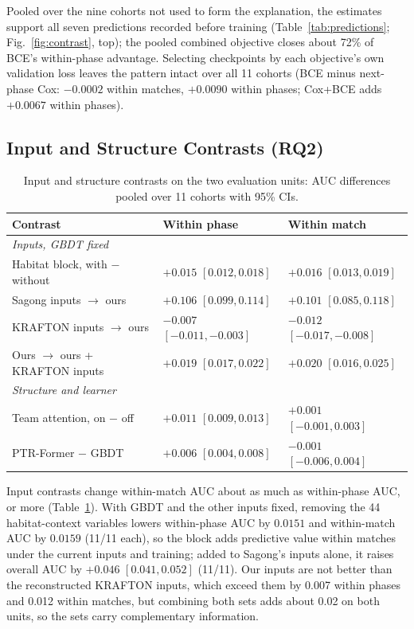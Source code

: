\documentclass[sigconf,anonymous]{acmart}
\begin{document}

Pooled over the nine cohorts not used to form the explanation, the estimates support all seven predictions recorded before training (Table~\ref{tab:predictions}; Fig.~\ref{fig:contrast}, top); the pooled combined objective closes about 72\% of BCE's within-phase advantage. Selecting checkpoints by each objective's own validation loss leaves the pattern intact over all 11 cohorts (BCE minus next-phase Cox: $-0.0002$ within matches, $+0.0090$ within phases; Cox+BCE adds $+0.0067$ within phases).

\subsection{Input and Structure Contrasts (RQ2)}
\label{sec:results:inputs}
\begin{table}[t]
\centering\scriptsize
\caption{Input and structure contrasts on the two evaluation units: AUC differences pooled over 11 cohorts with 95\% CIs.}
\label{tab:contrasts}
\setlength{\tabcolsep}{2.5pt}
\begin{tabular}{lll}
\toprule
Contrast & Within phase & Within match \\
\midrule
\multicolumn{3}{l}{\emph{Inputs, GBDT fixed}} \\
Habitat block, with $-$ without & $+0.015$ $[0.012, 0.018]$ & $+0.016$ $[0.013, 0.019]$ \\
Sagong inputs $\to$ ours & $+0.106$ $[0.099, 0.114]$ & $+0.101$ $[0.085, 0.118]$ \\
KRAFTON inputs $\to$ ours & $-0.007$ $[-0.011, -0.003]$ & $-0.012$ $[-0.017, -0.008]$ \\
Ours $\to$ ours + KRAFTON inputs & $+0.019$ $[0.017, 0.022]$ & $+0.020$ $[0.016, 0.025]$ \\
\midrule
\multicolumn{3}{l}{\emph{Structure and learner}} \\
Team attention, on $-$ off & $+0.011$ $[0.009, 0.013]$ & $+0.001$ $[-0.001, 0.003]$ \\
PTR-Former $-$ GBDT & $+0.006$ $[0.004, 0.008]$ & $-0.001$ $[-0.006, 0.004]$ \\
\bottomrule
\end{tabular}
\end{table}
Input contrasts change within-match AUC about as much as within-phase AUC, or more (Table~\ref{tab:contrasts}). With GBDT and the other inputs fixed, removing the 44 habitat-context variables lowers within-phase AUC by $0.0151$ and within-match AUC by $0.0159$ (11/11 each), so the block adds predictive value within matches under the current inputs and training; added to Sagong's inputs alone, it raises overall AUC by $+0.046$ $[0.041,\allowbreak 0.052]$ (11/11). Our inputs are not better than the reconstructed KRAFTON inputs, which exceed them by 0.007 within phases and 0.012 within matches, but combining both sets adds about 0.02 on both units, so the sets carry complementary information.
\end{document}
